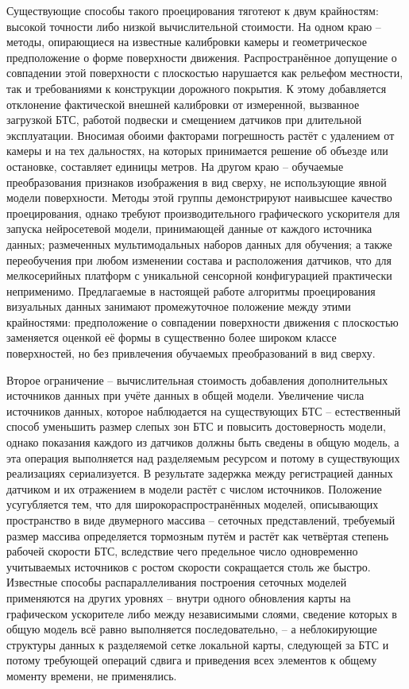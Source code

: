 Существующие способы такого проецирования тяготеют к двум крайностям: высокой точности либо низкой вычислительной стоимости. На одном краю -- методы, опирающиеся на известные калибровки камеры и геометрическое предположение о форме поверхности движения. Распространённое допущение о совпадении этой поверхности с плоскостью нарушается как рельефом местности, так и требованиями к конструкции дорожного покрытия. К этому добавляется отклонение фактической внешней калибровки от измеренной, вызванное загрузкой БТС, работой подвески и смещением датчиков при длительной эксплуатации. Вносимая обоими факторами погрешность растёт с удалением от камеры и на тех дальностях, на которых принимается решение об объезде или остановке, составляет единицы метров. На другом краю -- обучаемые преобразования признаков изображения в вид сверху, не использующие явной модели поверхности. Методы этой группы демонстрируют наивысшее качество проецирования, однако требуют производительного графического ускорителя для запуска нейросетевой модели, принимающей данные от каждого источника данных; размеченных мультимодальных наборов данных для обучения; а также переобучения при любом изменении состава и расположения датчиков, что для мелкосерийных платформ с уникальной сенсорной конфигурацией практически неприменимо. Предлагаемые в настоящей работе алгоритмы проецирования визуальных данных занимают промежуточное положение между этими крайностями: предположение о совпадении поверхности движения с плоскостью заменяется оценкой её формы в существенно более широком классе поверхностей, но без привлечения обучаемых преобразований в вид сверху.

Второе ограничение -- вычислительная стоимость добавления дополнительных источников данных при учёте данных в общей модели. Увеличение числа источников данных, которое наблюдается на существующих БТС -- естественный способ уменьшить размер слепых зон БТС и повысить достоверность модели, однако показания каждого из датчиков должны быть сведены в общую модель, а эта операция выполняется над разделяемым ресурсом и потому в существующих реализациях сериализуется. В результате задержка между регистрацией данных датчиком и их отражением в модели растёт с числом источников. Положение усугубляется тем, что для широкораспространённых моделей, описывающих пространство в виде двумерного массива -- сеточных представлений, требуемый размер массива определяется тормозным путём и растёт как четвёртая степень рабочей скорости БТС, вследствие чего предельное число одновременно учитываемых источников с ростом скорости сокращается столь же быстро. Известные способы распараллеливания построения сеточных моделей применяются на других уровнях -- внутри одного обновления карты на графическом ускорителе либо между независимыми слоями, сведение которых в общую модель всё равно выполняется последовательно, -- а неблокирующие структуры данных к разделяемой сетке локальной карты, следующей за БТС и потому требующей операций сдвига и приведения всех элементов к общему моменту времени, не применялись.

